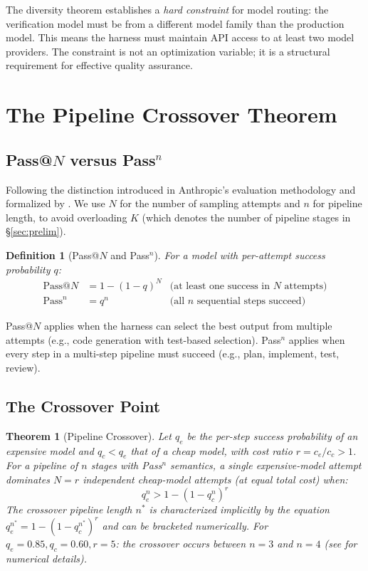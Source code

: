 \documentclass[11pt, a4paper, logo, copyright]{googledeepmind}
\newtheorem{definition}{Definition}[section]
\newtheorem{theorem}{Theorem}[section]
\begin{document}
The diversity theorem establishes a \emph{hard constraint} for model routing: the verification model must be from a different model family than the production model. This means the harness must maintain API access to at least two model providers. The constraint is not an optimization variable; it is a structural requirement for effective quality assurance.


\section{The Pipeline Crossover Theorem}
\label{sec:crossover}

\subsection{Pass@$N$ versus Pass${}^n$}

Following the distinction introduced in Anthropic's evaluation methodology and formalized by \citet{chen2021codex}. We use $N$ for the number of sampling attempts and $n$ for pipeline length, to avoid overloading $K$ (which denotes the number of pipeline stages in \S\ref{sec:prelim}).

\begin{definition}[Pass@$N$ and Pass${}^n$]
For a model with per-attempt success probability $q$:
\begin{align}
\text{Pass@}N &= 1 - (1-q)^N & \text{(at least one success in $N$ attempts)} \\
\text{Pass}^n &= q^n & \text{(all $n$ sequential steps succeed)}
\end{align}
\end{definition}

Pass@$N$ applies when the harness can select the best output from multiple attempts (e.g., code generation with test-based selection). Pass${}^n$ applies when every step in a multi-step pipeline must succeed (e.g., plan, implement, test, review).

\subsection{The Crossover Point}

\begin{theorem}[Pipeline Crossover]
\label{thm:crossover}
Let $q_e$ be the per-step success probability of an expensive model and $q_c < q_e$ that of a cheap model, with cost ratio $r = c_e / c_c > 1$. For a pipeline of $n$ stages with Pass${}^n$ semantics, a single expensive-model attempt dominates $N = r$ independent cheap-model attempts (at equal total cost) when:
\begin{equation}
q_e^n > 1 - (1 - q_c^n)^r
\end{equation}
The crossover pipeline length $n^*$ is characterized implicitly by the equation $q_e^{n^*} = 1 - (1 - q_c^{n^*})^r$ and can be bracketed numerically. For $q_e = 0.85, q_c = 0.60, r = 5$: the crossover occurs between $n = 3$ and $n = 4$ (see  for numerical details).
\end{theorem}
\end{document}
